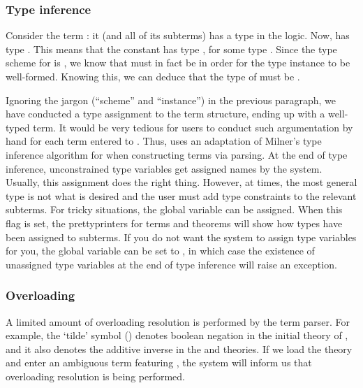 \subsubsection{Type inference}
\label{sec:parser:type-inference}

Consider the term : it (and all of its subterms)
has a type in the \HOL{} logic. Now,  has type . This
means that the constant \holtxt{=} has type ,
for some type . Since the type scheme for \holtxt{=} is
, we know that  must in fact be
 in order for the type instance to be well-formed. Knowing
this, we can deduce that the type of  must be .

Ignoring the jargon (``scheme'' and ``instance'') in the previous
paragraph, we have conducted a type assignment to the term structure,
ending up with a well-typed term. It would be very tedious for users
to conduct such argumentation by hand for each term entered to \HOL{}.
Thus, \HOL{} uses an adaptation of Milner's type inference algorithm
for \ML{} when constructing terms via parsing. At the end of type
inference, unconstrained type variables get assigned names by the system.
Usually, this assignment does the right thing. However, at times, the
most general type is not what is desired and the user must add type
constraints to the relevant subterms. For tricky situations, the
global variable  can be assigned. When this flag is
set, the prettyprinters for terms and theorems will show how types
have been assigned to subterms. If you do not want the system to
assign type variables for you, the global variable
 can be set to , in which case the
existence of unassigned type variables at the end of type inference
will raise an exception.


\subsubsection{Overloading}
\label{sec:parsing:overloading}

A limited amount of overloading resolution is performed by the term
parser. For example, the `tilde' symbol (\holtxt{\~{}})
denotes boolean negation in the initial theory of \HOL, and it also denotes
the additive inverse in the  and
 theories. If we load the 
theory and enter an ambiguous term featuring \holtxt{\~{}}, the
system will inform us that overloading resolution is being performed.

